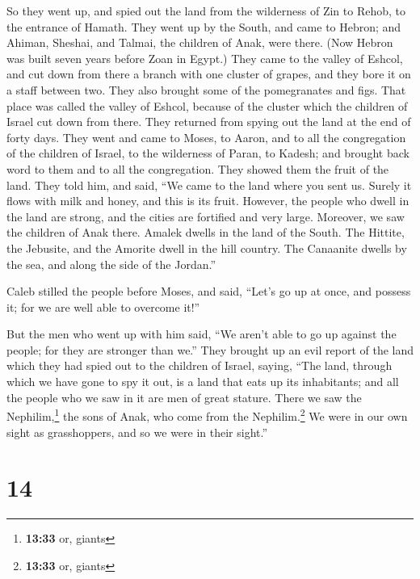  So they went up, and spied out the land from the
wilderness of Zin to Rehob, to the entrance of Hamath. 
They went up by the South, and came to Hebron; and Ahiman, Sheshai, and
Talmai, the children of Anak, were there. (Now Hebron was built seven
years before Zoan in Egypt.)  They came to the valley of
Eshcol, and cut down from there a branch with one cluster of grapes, and
they bore it on a staff between two. They also brought some of the
pomegranates and figs.  That place was called the valley
of Eshcol, because of the cluster which the children of Israel cut down
from there.  They returned from spying out the land at
the end of forty days.  They went and came to Moses, to
Aaron, and to all the congregation of the children of Israel, to the
wilderness of Paran, to Kadesh; and brought back word to them and to all
the congregation. They showed them the fruit of the land.
 They told him, and said, ``We came to the land where you
sent us. Surely it flows with milk and honey, and this is its fruit.
 However, the people who dwell in the land are strong,
and the cities are fortified and very large. Moreover, we saw the
children of Anak there.  Amalek dwells in the land of the
South. The Hittite, the Jebusite, and the Amorite dwell in the hill
country. The Canaanite dwells by the sea, and along the side of the
Jordan.''

 Caleb stilled the people before Moses, and said, ``Let's
go up at once, and possess it; for we are well able to overcome it!''

 But the men who went up with him said, ``We aren't able
to go up against the people; for they are stronger than we.''
 They brought up an evil report of the land which they
had spied out to the children of Israel, saying, ``The land, through
which we have gone to spy it out, is a land that eats up its
inhabitants; and all the people who we saw in it are men of great
stature.  There we saw the Nephilim,\footnote{\textbf{13:33}
  or, giants} the sons of Anak, who come from the Nephilim.\footnote{\textbf{13:33}
  or, giants} We were in our own sight as grasshoppers, and so we were
in their sight.''

\hypertarget{section-13}{%
\section{14}\label{section-13}}

